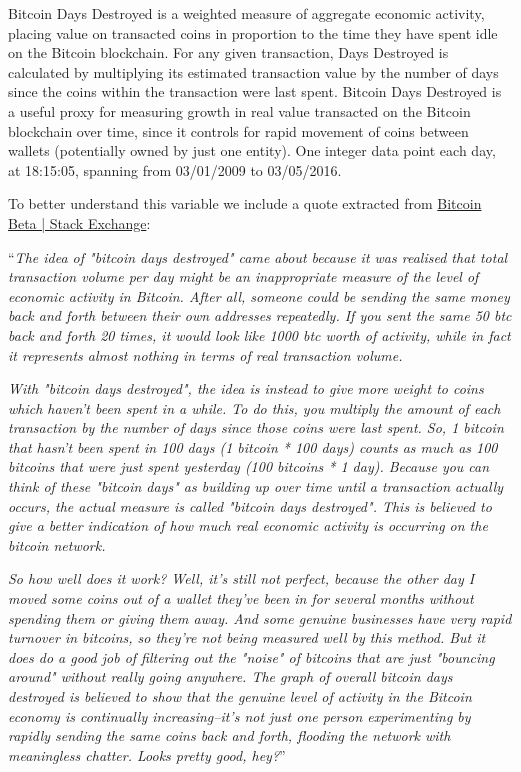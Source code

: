 Bitcoin Days Destroyed is a weighted measure of aggregate economic
activity, placing value on transacted coins in proportion to the time
they have spent idle on the Bitcoin blockchain. For any given
transaction, Days Destroyed is calculated by multiplying its estimated
transaction value by the number of days since the coins within the
transaction were last spent. Bitcoin Days Destroyed is a useful proxy
for measuring growth in real value transacted on the Bitcoin
blockchain over time, since it controls for rapid movement of coins
between wallets (potentially owned by just one entity). One integer
data point each day, at 18:15:05, spanning from 03/01/2009 to
03/05/2016.

To better understand this variable we include a quote extracted from
\href{http://bitcoin.stackexchange.com/questions/845/what-are-bitcoin-days-destroyed}{Bitcoin
  Beta | Stack Exchange}: 

``\textit{The idea of "bitcoin days destroyed" came about because it was
  realised that total transaction volume per day might be an
  inappropriate measure of the level of economic activity in Bitcoin.
  After all, someone could be sending the same money back and forth
  between their own addresses repeatedly. If you sent the same 50 btc
  back and forth 20 times, it would look like 1000 btc worth of
  activity, while in fact it represents almost nothing in terms of
  real transaction volume.}

\textit{With "bitcoin days destroyed", the idea is instead to give more
  weight to coins which haven't been spent in a while. To do this, you
  multiply the amount of each transaction by the number of days since
  those coins were last spent. So, 1 bitcoin that hasn't been spent in
  100 days (1 bitcoin * 100 days) counts as much as 100 bitcoins that
  were just spent yesterday (100 bitcoins * 1 day). Because you can
  think of these "bitcoin days" as building up over time until a
  transaction actually occurs, the actual measure is called "bitcoin
  days destroyed". This is believed to give a better indication of how
  much real economic activity is occurring on the bitcoin network.}

\textit{  So how well does it work? Well, it's still not perfect, because the
  other day I moved some coins out of a wallet they've been in for
  several months without spending them or giving them away. And some
  genuine businesses have very rapid turnover in bitcoins, so they're
  not being measured well by this method. But it does do a good job of
  filtering out the "noise" of bitcoins that are just "bouncing
  around" without really going anywhere. The graph of overall bitcoin
  days destroyed is believed to show that the genuine level of
  activity in the Bitcoin economy is continually increasing--it's not
  just one person experimenting by rapidly sending the same coins back
  and forth, flooding the network with meaningless chatter. Looks
  pretty good, hey?}''

